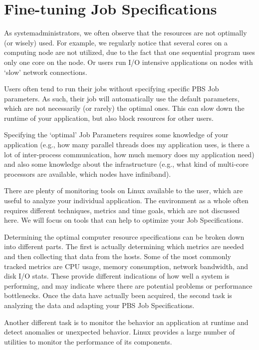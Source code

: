\chapter{Fine-tuning Job Specifications}

As \hpc systemadministrators, we often observe that the \hpc resources are
not optimally (or wisely) used. For example, we regularly notice that several
cores on a computing node are not utilized, due to the fact that one sequential
program uses only one core on the node. Or users run I/O intensive applications
on nodes with `slow' network connections.

Users often tend to run their jobs without specifying specific PBS Job
parameters.  As such, their job will automatically use the default parameters,
which are not necessarily (or rarely) the optimal ones.  This can slow down the
runtime of your application, but also block \hpc resources for other users.

Specifying the `optimal' Job Parameters requires some knowledge of your
application (e.g., how many parallel threads does my application uses, is there
a lot of inter-process communication, how much memory does my application need)
and also some knowledge about the \hpc infrastructure (e.g., what kind of
multi-core processors are available, which nodes have infiniband).

There are plenty of monitoring tools on Linux available to the user, which are
useful to analyze your individual application. The \hpc environment as a
whole often requires different techniques, metrics and time goals, which are
not discussed here. We will focus on tools that can help to optimize your Job
Specifications.

Determining the optimal computer resource specifications can be broken down
into different parts. The first is actually determining which metrics are
needed and then collecting that data from the hosts. Some of the most commonly
tracked metrics are CPU usage, memory consumption, network bandwidth, and disk
I/O stats. These provide different indications of how well a system is
performing, and may indicate where there are potential problems or performance
bottlenecks. Once the data have actually been acquired, the second task is
analyzing the data and adapting your PBS Job Specifications.

Another different task is to monitor the behavior an application at runtime and
detect anomalies or unexpected behavior. Linux provides a large number of
utilities to monitor the performance of its components.

